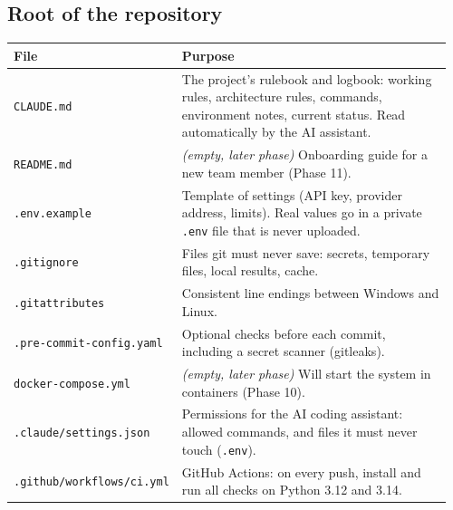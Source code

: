 \documentclass[11pt,a4paper]{article}
\newcommand{\code}[1]{\nolinkurl{#1}}
\newcommand{\empt}{\textit{(empty, later phase)}}
\begin{document}
\subsection{Root of the repository}
\begin{longtable}{@{}p{0.34\linewidth}p{0.62\linewidth}@{}}
\toprule
\textbf{File} & \textbf{Purpose} \\
\midrule
\endhead
\code{CLAUDE.md} & The project's rulebook and logbook: working rules, architecture rules, commands, environment notes, current status. Read automatically by the AI assistant. \\
\code{README.md} & \empt{} Onboarding guide for a new team member (Phase 11). \\
\code{.env.example} & Template of settings (API key, provider address, limits). Real values go in a private \code{.env} file that is never uploaded. \\
\code{.gitignore} & Files git must never save: secrets, temporary files, local results, cache. \\
\code{.gitattributes} & Consistent line endings between Windows and Linux. \\
\code{.pre-commit-config.yaml} & Optional checks before each commit, including a secret scanner (gitleaks). \\
\code{docker-compose.yml} & \empt{} Will start the system in containers (Phase 10). \\
\code{.claude/settings.json} & Permissions for the AI coding assistant: allowed commands, and files it must never touch (\code{.env}). \\
\code{.github/workflows/ci.yml} & GitHub Actions: on every push, install and run all checks on Python 3.12 and 3.14. \\
\bottomrule
\end{longtable}
\end{document}
